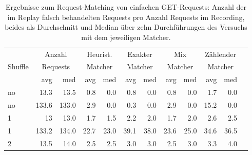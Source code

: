 \documentclass[12pt,a4paper]{report}
\begin{document}
\begin{table}[H]
	\centering
	\caption{
		Ergebnisse zum Request-Matching von einfachen GET-Requests:
		Anzahl der im Replay falsch behandelten Requests pro Anzahl Requests im Recording,
		beides als Durchschnitt und Median über zehn Durchführungen des Versuchs mit dem jeweiligen Matcher.
	}
	\label{tab:get}
	\begin{tabular}{|l|r|r|r|r|r|r|r|r|r|r|r|}
		\hline
		\multirow{3}{*}{Shuffle} & \multicolumn{2}{|c|}{Anzahl}   & \multicolumn{2}{|c|}{Heurist.} & \multicolumn{2}{|c|}{Exakter} & \multicolumn{2}{|c|}{Mix}     & \multicolumn{2}{|c|}{Zählender}                                    \\
		                         & \multicolumn{2}{|c|}{Requests} & \multicolumn{2}{|c|}{Matcher}  & \multicolumn{2}{|c|}{Matcher} & \multicolumn{2}{|c|}{Matcher} & \multicolumn{2}{|c|}{Matcher}                                      \\ \cline{2-11}
		                         & avg                            & med                            & avg                           & med                           & avg                             & med  & avg  & med  & avg  & med  \\ \hline
		no                       & 13.3                           & 13.5                           & 0.8                           & 0.0                           & 0.8                             & 0.0  & 0.8  & 0.0  & 1.7  & 0.0  \\ \hline
		no                       & 133.6                          & 133.0                          & 2.9                           & 0.0                           & 0.3                             & 0.0  & 2.9  & 0.0  & 15.2 & 0.0  \\ \hline
		1                        & 13                             & 13.0                           & 1.7                           & 1.5                           & 2.2                             & 2.0  & 1.7  & 2.0  & 2.6  & 2.5  \\ \hline
		1                        & 133.2                          & 134.0                          & 22.7                          & 23.0                          & 39.1                            & 38.0 & 23.6 & 25.0 & 34.6 & 36.5 \\ \hline
		2                        & 13.5                           & 14.0                           & 2.5                           & 2.5                           & 3.0                             & 3.0  & 2.5  & 3.0  & 3.3  & 4.0  \\ \hline

\end{tabular}
\end{table}
\end{document}
